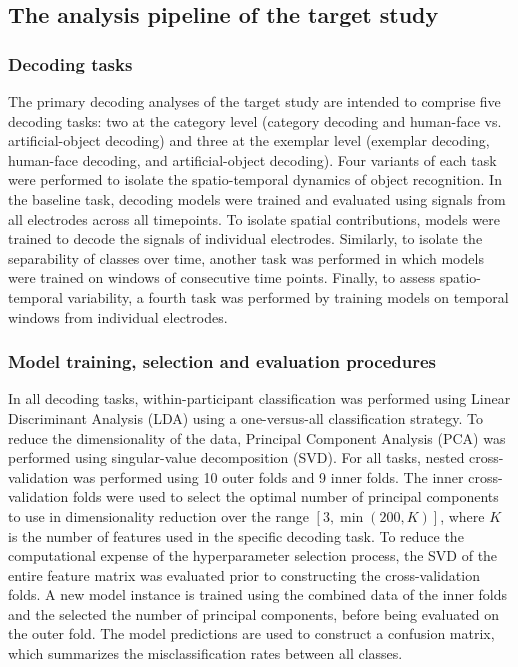 \subsection{The analysis pipeline of the target study}

\subsubsection{Decoding tasks}
The primary decoding analyses of the target study are intended to comprise five decoding tasks: two at the category level (category decoding and human-face vs. artificial-object decoding) and three at the exemplar level (exemplar decoding, human-face decoding, and artificial-object decoding). Four variants of each task were performed to isolate the spatio-temporal dynamics of object recognition. In the baseline task, decoding models were trained and evaluated using signals from all electrodes across all timepoints. To isolate spatial contributions, models were trained to decode the signals of individual electrodes. Similarly, to isolate the separability of classes over time, another task was performed in which models were trained on windows of consecutive time points. Finally, to assess spatio-temporal variability, a fourth task was performed by training models on temporal windows from individual electrodes.

\subsubsection{Model training, selection and evaluation procedures}

In all decoding tasks, within-participant classification was performed using Linear Discriminant Analysis (LDA) using a one-versus-all classification strategy. To reduce the dimensionality of the data, Principal Component Analysis (PCA) was performed using singular-value decomposition (SVD). For all tasks, nested cross-validation was performed using 10 outer folds and 9 inner folds. The inner cross-validation folds were used to select the optimal number of principal components to use in dimensionality reduction over the range \([3, \min\left (200, K\right )]\), where \(K\) is the number of features used in the specific decoding task. To reduce the computational expense of the hyperparameter selection process, the SVD of the entire feature matrix was evaluated prior to constructing the cross-validation folds. A new model instance is trained using the combined data of the inner folds and the selected the number of principal components, before being evaluated on the outer fold. The model predictions are used to construct a confusion matrix, which summarizes the misclassification rates between all classes. 
 
